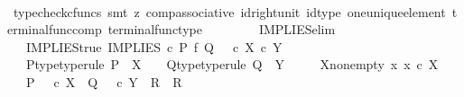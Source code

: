 \begin{isabellebody}
\ \ \ \ \ \ \ \ \isamarkupfalse%
\ {\isacharparenleft}{\kern0pt}typecheck{\isacharunderscore}{\kern0pt}cfuncs{\isacharcomma}{\kern0pt}\ smt\ {\isacharparenleft}{\kern0pt}z{}{\isacharparenright}{\kern0pt}\ comp{\isacharunderscore}{\kern0pt}associative{}\ id{\isacharunderscore}{\kern0pt}right{\isacharunderscore}{\kern0pt}unit{}\ id{\isacharunderscore}{\kern0pt}type\ one{\isacharunderscore}{\kern0pt}unique{\isacharunderscore}{\kern0pt}element\ terminal{\isacharunderscore}{\kern0pt}func{\isacharunderscore}{\kern0pt}comp\ terminal{\isacharunderscore}{\kern0pt}func{\isacharunderscore}{\kern0pt}type{\isacharparenright}{\kern0pt}\isanewline
\ \ \ \ \isamarkupfalse%
\isanewline
\ \ \isamarkupfalse%
\isanewline
{}\isamarkupfalse%
%
\endisatagproof
{\isafoldproof}%
%
\isadelimproof
\isanewline
%
\endisadelimproof
\isanewline
{}\isamarkupfalse%
\ IMPLIES{\isacharunderscore}{\kern0pt}elim{\isacharcolon}{\kern0pt}\isanewline
\ \ \ IMPLIES{\isacharunderscore}{\kern0pt}true{\isacharcolon}{\kern0pt}\ {\isachardoublequoteopen}IMPLIES\ {\isasymcirc}\isactrlsub c\ {\isacharparenleft}{\kern0pt}P\ {\isasymtimes}\isactrlsub f\ Q{\isacharparenright}{\kern0pt}\ {\isacharequal}{\kern0pt}\ {\isasymt}\ {\isasymcirc}\isactrlsub c\ {\isasymbeta}\isactrlbsub X\ {\isasymtimes}\isactrlsub c\ Y\isactrlesub {\isachardoublequoteclose}\isanewline
\ \ \ P{\isacharunderscore}{\kern0pt}type{\isacharbrackleft}{\kern0pt}type{\isacharunderscore}{\kern0pt}rule{\isacharbrackright}{\kern0pt}{\isacharcolon}{\kern0pt}\ {\isachardoublequoteopen}P\ {\isacharcolon}{\kern0pt}\ X\ {\isasymrightarrow}\ {\isasymOmega}{\isachardoublequoteclose}\ \ Q{\isacharunderscore}{\kern0pt}type{\isacharbrackleft}{\kern0pt}type{\isacharunderscore}{\kern0pt}rule{\isacharbrackright}{\kern0pt}{\isacharcolon}{\kern0pt}\ {\isachardoublequoteopen}Q\ {\isacharcolon}{\kern0pt}\ Y\ {\isasymrightarrow}\ {\isasymOmega}{\isachardoublequoteclose}\isanewline
\ \ \ X{\isacharunderscore}{\kern0pt}nonempty{\isacharcolon}{\kern0pt}\ {\isachardoublequoteopen}{\isasymexists}x{\isachardot}{\kern0pt}\ x\ {\isasymin}\isactrlsub c\ X{\isachardoublequoteclose}\isanewline
\ \ \ {\isachardoublequoteopen}{\isacharparenleft}{\kern0pt}P\ {\isacharequal}{\kern0pt}\ {\isasymt}\ {\isasymcirc}\isactrlsub c\ {\isasymbeta}\isactrlbsub X\isactrlesub {\isacharparenright}{\kern0pt}\ {\isasymLongrightarrow}\ {\isacharparenleft}{\kern0pt}{\isacharparenleft}{\kern0pt}Q\ {\isacharequal}{\kern0pt}\ {\isasymt}\ {\isasymcirc}\isactrlsub c\ {\isasymbeta}\isactrlbsub Y\isactrlesub {\isacharparenright}{\kern0pt}\ {\isasymLongrightarrow}\ R{\isacharparenright}{\kern0pt}\ {\isasymLongrightarrow}\ R{\isachardoublequoteclose}\isanewline

\end{isabellebody}
